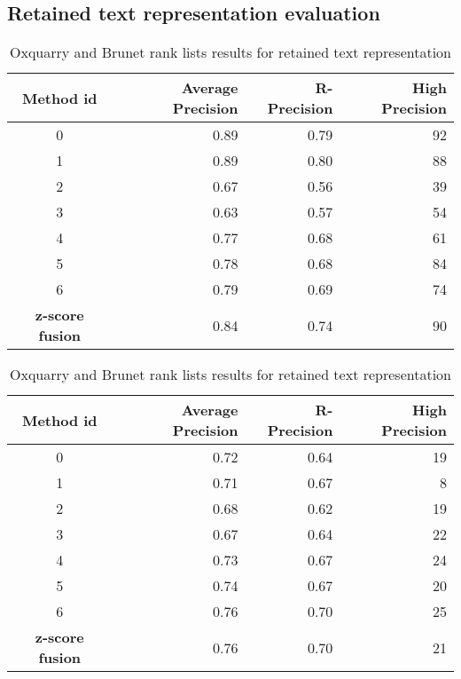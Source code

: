 \newpage
\subsection{Retained text representation evaluation}
\label{sec:annex_retained_text_representation}

\begin{table}[H]
  \centering
  \caption{Oxquarry and Brunet rank lists results for retained text representation}
  \label{tab:9rl_results_brunet_oxquarry}

  \begin{tabular}{c r r r}
    \toprule
    Method id &
    Average Precision &
    R-Precision &
    High Precision \\
    \midrule
    0 & 0.89 & 0.79 & 92 \\
    1 & 0.89 & 0.80 & 88 \\
    2 & 0.67 & 0.56 & 39 \\
    3 & 0.63 & 0.57 & 54 \\
    4 & 0.77 & 0.68 & 61 \\
    5 & 0.78 & 0.68 & 84 \\
    6 & 0.79 & 0.69 & 74 \\
    \textbf{z-score fusion} &  0.84 & 0.74 & 90 \\
    \bottomrule
  \end{tabular}

  \begin{tabular}{c r r r}
    \toprule
    Method id &
    Average Precision &
    R-Precision &
    High Precision \\
    \midrule
    0 & 0.72 & 0.64 & 19 \\
    1 & 0.71 & 0.67 &  8 \\
    2 & 0.68 & 0.62 & 19 \\
    3 & 0.67 & 0.64 & 22 \\
    4 & 0.73 & 0.67 & 24 \\
    5 & 0.74 & 0.67 & 20 \\
    6 & 0.76 & 0.70 & 25 \\
    \textbf{z-score fusion} & 0.76 &  0.70 & 21 \\
    \bottomrule
  \end{tabular}

\end{table}


